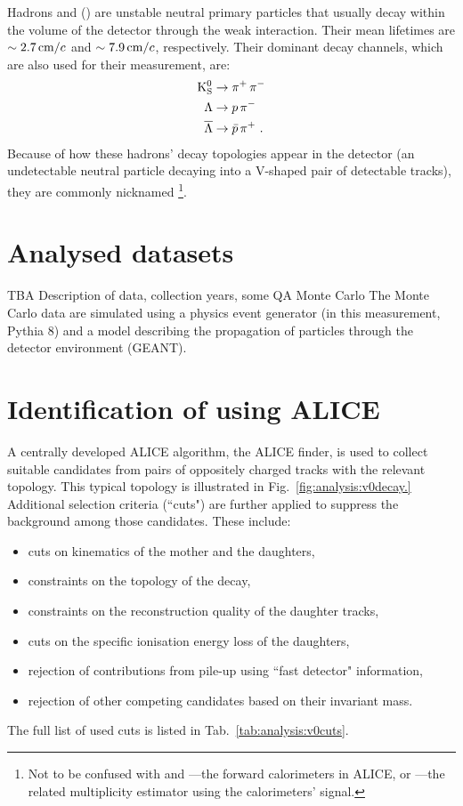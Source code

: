 \def \imgpath {"./figures/analysis"}
Hadrons \KOs and \LA (\AL) are unstable neutral primary particles that usually decay within the volume of the detector through the weak interaction. Their mean lifetimes are $\sim 2.7 \text{\,cm/$c$}$ and $\sim 7.9 \text{\,cm/$c$}$, respectively.\cite{ALICEprimaries} Their dominant decay channels, which are also used for their measurement, are:
\begin{align}
\rm{K^0_S} &\rightarrow \pi^{+} \, \pi^{-} \\
\Lambda &\rightarrow p \, \pi^{-} \\
\overline{\Lambda} &\rightarrow \bar{p} \, \pi^{+} \, \, .
\end{align}
Because of how these hadrons' decay topologies appear in the detector (an undetectable neutral particle decaying into a V-shaped pair of detectable tracks), they are commonly nicknamed \VOs \footnote{Not to be confused with \VOA and \VOC---the forward calorimeters in ALICE, or \VOM---the related multiplicity estimator using the calorimeters' signal.}. 

\section{Analysed datasets}
TBA
Description of data, collection years, some QA
Monte Carlo
The Monte Carlo data are simulated using a physics event generator (in this measurement, Pythia 8\cite{}) and a model describing the propagation of particles through the detector environment (GEANT\cite{}). 

\section{Identification of \VOs using ALICE}
A centrally developed ALICE algorithm, the ALICE \VO finder, is used to collect suitable \VO candidates from pairs of oppositely charged tracks  with the relevant topology. This typical topology is illustrated in Fig.~\ref{fig:analysis:v0decay.} %
Additional selection criteria (``cuts") are further applied to suppress the background among those candidates. These include:
\begin{itemize}
\item cuts on kinematics of the mother and the daughters,
\item constraints on the topology of the decay,
\item constraints on the reconstruction quality of the daughter tracks,
\item cuts on the specific ionisation energy loss of the daughters, 
\item rejection of contributions from pile-up using ``fast detector" information,
\item rejection of other competing \VO candidates based on their invariant mass.
\end{itemize}
The full list of used cuts is listed in Tab.~\ref{tab:analysis:v0cuts}.


